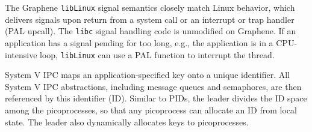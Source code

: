 The Graphene {\tt libLinux} signal semantics closely match Linux behavior, which
delivers signals upon return from a system call or an interrupt or trap handler (PAL upcall).
The {\tt libc} signal handling code is unmodified on Graphene.
If an application has a signal pending for too long,
e.g., the application is in a CPU-intensive loop, {\tt libLinux} can use a PAL function to interrupt 
the thread. 




\begin{comment}
Graphene internally indexes point-to-point handles using PIDs.
In order to facilitate reallocation of PIDs without global coordination, 
Graphene-internal PIDs also include a {\em generation number},
allowing picoprocesses to lazily detect reuse similar to generation numbers 
for inodes in NFS~\cite{sandberg85nfs}.
\end{comment}

\vspace{5pt}
 System V IPC
maps an application-specified key onto a unique identifier.
All System V IPC abstractions, including message queues and semaphores,
are then referenced by this identifier (ID).
Similar to PIDs, 
the leader divides the ID space among the picoprocesses, so that any picoprocess
can allocate an ID from local state. %
The leader also dynamically allocates keys to picoprocesses.

